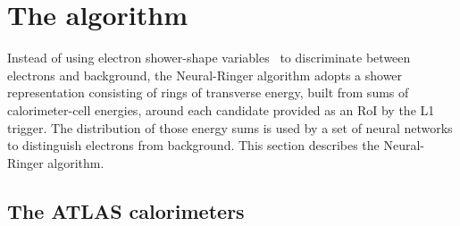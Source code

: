 \section{The \rnn{} algorithm}%
\label{sec:neuralringer}


Instead of using electron shower-shape variables~\cite{TRIG-2018-05} to discriminate between electrons and background, the Neural-Ringer algorithm adopts a shower representation consisting of rings of transverse energy, built from sums of calorimeter-cell energies, around each candidate provided as an RoI by the L1 trigger. The distribution of those energy sums is used by a set of neural networks to distinguish electrons from background. This section describes the Neural-Ringer algorithm.

\subsection{The ATLAS calorimeters}

